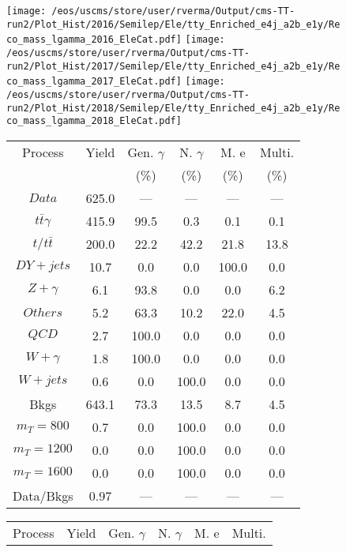 \begin{figure}
\centering
\texttt{[image: /eos/uscms/store/user/rverma/Output/cms-TT-run2/Plot\_Hist/2016/Semilep/Ele/tty\_Enriched\_e4j\_a2b\_e1y/Reco\_mass\_lgamma\_2016\_EleCat.pdf]}
\texttt{[image: /eos/uscms/store/user/rverma/Output/cms-TT-run2/Plot\_Hist/2017/Semilep/Ele/tty\_Enriched\_e4j\_a2b\_e1y/Reco\_mass\_lgamma\_2017\_EleCat.pdf]}
\texttt{[image: /eos/uscms/store/user/rverma/Output/cms-TT-run2/Plot\_Hist/2018/Semilep/Ele/tty\_Enriched\_e4j\_a2b\_e1y/Reco\_mass\_lgamma\_2018\_EleCat.pdf]}
\begin{minipage}[c]{0.32\textwidth}
\centering
\tiny{
\begin{tabular}{cccccc}
\hline
Process & Yield & Gen. $\gamma$ & N. $\gamma$ & M. e & Multi. \\
 &  & (\%) & (\%) & (\%) & (\%)  \\
\hline
                                                                      $ Data $ &  625.0 &  --- &  --- &  --- &  ---\\
$ t\bar{t}\gamma $ &  415.9 &  99.5 &  0.3 &  0.1 &  0.1\\
$ t/t\bar{t} $ &  200.0 &  22.2 &  42.2 &  21.8 &  13.8\\
$ DY+jets $ &  10.7 &  0.0 &  0.0 &  100.0 &  0.0\\
$ Z+\gamma $ &  6.1 &  93.8 &  0.0 &  0.0 &  6.2\\
$ Others $ &  5.2 &  63.3 &  10.2 &  22.0 &  4.5\\
$ QCD $ &  2.7 &  100.0 &  0.0 &  0.0 &  0.0\\
$ W+\gamma $ &  1.8 &  100.0 &  0.0 &  0.0 &  0.0\\
$ W+jets $ &  0.6 &  0.0 &  100.0 &  0.0 &  0.0\\
Bkgs &  643.1 &  73.3 &  13.5 &  8.7 &  4.5\\
$ m_{T} = 800 $ &  0.7 &  0.0 &  100.0 &  0.0 &  0.0\\
$ m_{T} = 1200 $ &  0.0 &  0.0 &  100.0 &  0.0 &  0.0\\
$ m_{T} = 1600 $ &  0.0 &  0.0 &  100.0 &  0.0 &  0.0\\
Data/Bkgs &  0.97 &  --- &  --- &  --- &  ---\\
\hline
\end{tabular}
}
\end{minipage}
\begin{minipage}[c]{0.32\textwidth}
\centering
\tiny{
\begin{tabular}{cccccc}
\hline
Process & Yield & Gen. $\gamma$ & N. $\gamma$ & M. e & Multi. \\

\end{tabular}}
\end{minipage}
\end{figure}
